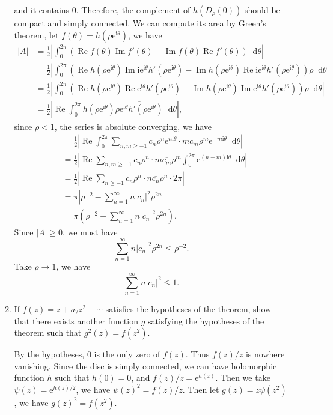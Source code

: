\documentclass[11pt]{report}
\theoremstyle{mythm}
\let\oldendproof\endproof
\renewenvironment{proof}[1][\proofname]{%
  \oldproof[\normalfont \bfseries #1]%
}{\oldendproof}
\renewcommand*{\proofname}{Proof}
\theoremstyle{myans}
\newcommand{\mi}{\mathrm{i}}
\newcommand{\me}{\mathrm{e}}
\newcommand{\dd}{\mathop{}\!\mathrm{d}}
\renewcommand{\Re}{\operatorname{Re}}
\renewcommand{\Im}{\operatorname{Im}}
\begin{document}
\begin{enumerate}
\begin{enumerate}
\begin{proof}
      and it contains $0$. Therefore, the complement of $h(D_\rho(0))$ should be compact and simply connected.
      We can compute its area by Green's theorem, let $f(\theta) = h(\rho \me^{\mi \theta})$, we have
      \begin{align*}
        |A| &= \frac 12\left| \int_0^{2\pi} (\Re f(\theta) \Im f'(\theta)
        - \Im f(\theta) \Re f'(\theta)) \dd \theta \right|\\
        &= \frac 12 \left| \int_0^{2\pi} (\Re h(\rho \me^{\mi\theta}) \Im \mi \me^{\mi \theta} h'(\rho \me^{\mi\theta})
        - \Im h(\rho \me^{\mi\theta}) \Re \mi \me^{\mi \theta} h'(\rho \me^{\mi\theta})) \rho\dd \theta \right|\\
        &= \frac 12\left| \int_0^{2\pi} (\Re h(\rho \me^{\mi\theta}) \Re \me^{\mi \theta} h'(\rho \me^{\mi\theta})
        + \Im h(\rho \me^{\mi\theta}) \Im \me^{\mi \theta} h'(\rho \me^{\mi\theta})) \rho\dd \theta \right|\\
        &= \frac 12\left| \Re \int_0^{2\pi} h(\rho\me^{\mi \theta}) \overline{\rho \me^{\mi \theta} h'(\rho\me^{\mi\theta})}\dd \theta \right|,
      \end{align*}
      since $\rho<1$, the series is absolute converging, we have
      \begin{align*}
        &= \frac 12 \left| \Re \int_0^{2\pi} \sum_{n, m\geq -1}
        c_n \rho^n \me^{n\mi \theta}\cdot m\overline{c_m} \rho^{m} \me^{-m\mi \theta} \dd \theta \right|\\
        &= \frac 12 \left| \Re \sum_{n, m\geq -1}
        c_n \rho^n \cdot m\overline{c_m} \rho^{m}\int_0^{2\pi}  \me^{(n-m)\mi \theta}  \dd \theta \right|\\
        &= \frac 12 \left| \Re \sum_{n\geq -1}
        c_n \rho^n \cdot n\overline{c_{n}} \rho^{n} \cdot 2\pi \right|\\
        &= \pi \left| \rho^{-2} - \sum_{n=1}^\infty n |c_n|^2 \rho^{2n} \right|\\
        &= \pi \left(\rho^{-2} - \sum_{n=1}^\infty n |c_n|^2 \rho^{2n}\right).
      \end{align*}
      Since $|A|\geq 0$, we must have
      \[ \sum_{n=1}^\infty n |c_n|^2 \rho^{2n} \leq \rho^{-2}. \]
      Take $\rho\to 1$, we have
      \[ \sum_{n=1}^\infty n |c_n|^2 \leq 1. \]
    \end{proof}
    \item If $f(z)=z + a_2 z^2 + \cdots$ satisfies the hypotheses of the theorem, show
    that there exists another function $g$ satisfying the hypotheses of the theorem such
    that $g^2(z) = f(z^2)$.
    \begin{proof}
      By the hypotheses, $0$ is the only zero of $f(z)$. Thus $f(z)/z$ is nowhere vanishing.
      Since the disc is simply connected, we can have holomorphic function $h$ such that
      $h(0)=0$, and $f(z)/z=\me^{h(z)}$. Then we take $\psi(z) = \me^{h(z)/2}$, we have
      $\psi(z)^2 = f(z)/z$. Then let $g(z) = z\psi (z^2)$, we have $g(z)^2 = f(z^2)$.


\end{proof}
\end{enumerate}
\end{enumerate}
\end{document}
